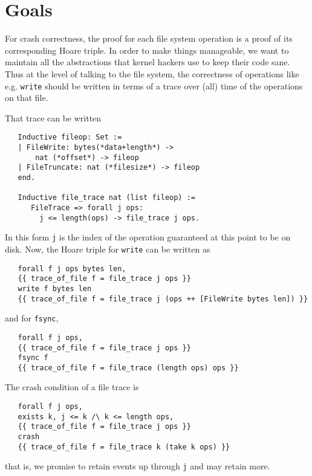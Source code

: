 \documentclass[11pt, twocolumn, letterpaper]{article}
\begin{document}
\section{Goals}

%

For crash correctness, the proof for each file system operation is a
proof of its corresponding Hoare triple.
In order to make things manageable, we want to maintain all the
abstractions that kernel hackers use to keep their code sane.
Thus at the level of talking to the file system, the correctness of
operations like e.g. \texttt{write} should be written in terms of
a trace over (all) time of the operations on that file.

That trace can be written
{\tiny
\begin{verbatim}
   Inductive fileop: Set :=
   | FileWrite: bytes(*data+length*) ->
       nat (*offset*) -> fileop
   | FileTruncate: nat (*filesize*) -> fileop
   end.

   Inductive file_trace nat (list fileop) :=
      FileTrace => forall j ops:
        j <= length(ops) -> file_trace j ops.
\end{verbatim}
}
In this form \texttt{j} is the index of the operation guaranteed at
this point to be on disk.
Now, the Hoare triple for \texttt{write} can be written as
{\tiny
\begin{verbatim}
   forall f j ops bytes len,
   {{ trace_of_file f = file_trace j ops }}
   write f bytes len
   {{ trace_of_file f = file_trace j (ops ++ [FileWrite bytes len]) }}
\end{verbatim}
}
and for \texttt{fsync},
{\tiny
\begin{verbatim}
   forall f j ops,
   {{ trace_of_file f = file_trace j ops }}
   fsync f
   {{ trace_of_file f = file_trace (length ops) ops }}
\end{verbatim}
}

The crash condition of a file trace is
{\tiny
\begin{verbatim}
   forall f j ops,
   exists k, j <= k /\ k <= length ops,
   {{ trace_of_file f = file_trace j ops }}
   crash
   {{ trace_of_file f = file_trace k (take k ops) }}
\end{verbatim}
}
that is, we promise to retain events up through \texttt{j} and may
retain more.
\end{document}
